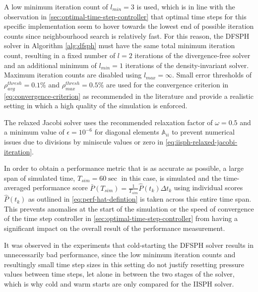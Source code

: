 \documentclass[oneside, a4paper]{book}
\begin{document}
  A low minimum iteration count of $l_{min}=3$ is used, which is in line with the observation in \autoref{sec:optimal-time-step-controller} that optimal time steps for this specific implementation seem to hover towards the lowest end of possible iteration counts since neighbourhood search is relatively fast. For this reason, the DFSPH solver in Algorithm \ref{alg:dfsph} must have the same total minimum iteration count, resulting in a fixed number of $l=2$ iterations of the divergence-free solver and an additional minimum of $l_{min}=1$ iterations of the density-invariant solver. Maximum iteration counts are disabled using $l_{max}=\infty$. Small error thresholds of $\rho_{avg}^{thresh}=0.1\% $\autocite{iisph} and $\rho_{max}^{thresh}=0.5\%$ are used for the convergence criterion in \autoref{eq:convergence-criterion} as recommended in the literature and provide a realistic setting in which a high quality of the simulation is enforced. 

  The relaxed Jacobi solver uses the recommended \autocite{iisph} relaxation factor of $\omega=0.5$ and a minimum value of $\epsilon=10^{-6}$ for diagonal elements $\mathds{A}_{ii}$ to prevent numerical issues due to divisions by miniscule values or zero in \autoref{eq:iisph-relaxed-jacobi-iteration}.

  In order to obtain a performance metric that is as accurate as possible, a large span of simulated time, $T_{sim}=60\sec$ in this case, is simulated and the time-averaged performance score $\bar{P}(T_{sim}) = \frac{1}{T_{sim}} \hat{P}(t_k)\Delta t_k$ using individual scores $\hat{P}(t_k)$ as outlined in \autoref{eq:perf-hat-defintion} is taken across this entire time span. This prevents anomalies at the start of the simulation or the speed of convergence of the time step controller in \autoref{sec:optimal-time-step-controller} from having a significant impact on the overall result of the performance measurement.

  It was observed in the experiments that cold-starting the DFSPH solver results in unnecessarily bad performance, since the low minimum iteration counts and resultingly small time step sizes in this setting do not justify resetting pressure values between time steps, let alone in between the two stages of the solver, which is why cold and warm starts are only compared for the IISPH solver.


\end{document}
